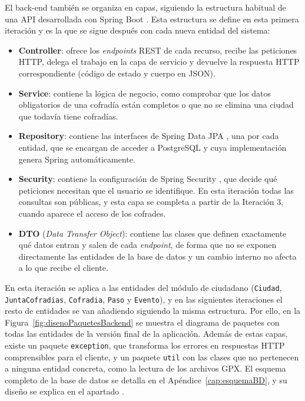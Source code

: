 El back-end también se organiza en capas, siguiendo la estructura habitual de una API desarrollada con Spring Boot \cite{sommerville2015}. Esta estructura se define en esta primera iteración y es la que se sigue después con cada nueva entidad del sistema:

\begin{itemize}
    \item \textbf{Controller}: ofrece los \emph{endpoints} REST de cada recurso, recibe las peticiones HTTP, delega el trabajo en la capa de servicio y devuelve la respuesta HTTP correspondiente (código de estado y cuerpo en JSON).
    \item \textbf{Service}: contiene la lógica de negocio, como comprobar que los datos obligatorios de una cofradía están completos o que no se elimina una ciudad que todavía tiene cofradías.
    \item \textbf{Repository}: contiene las interfaces de Spring Data JPA \cite{springdatajpa}, una por cada entidad, que se encargan de acceder a PostgreSQL y cuya implementación genera Spring automáticamente.
    \item \textbf{Security}: contiene la configuración de Spring Security \cite{springsecurity}, que decide qué peticiones necesitan que el usuario se identifique. En esta iteración todas las consultas son públicas, y esta capa se completa a partir de la Iteración 3, cuando aparece el acceso de los cofrades.
    \item \textbf{DTO} (\emph{Data Transfer Object}): contiene las clases que definen exactamente qué datos entran y salen de cada \emph{endpoint}, de forma que no se exponen directamente las entidades de la base de datos y un cambio interno no afecta a lo que recibe el cliente.
\end{itemize}

En esta iteración se aplica a las entidades del módulo de ciudadano (\texttt{Ciudad}, \texttt{JuntaCofradias}, \texttt{Cofradia}, \texttt{Paso} y \texttt{Evento}), y en las siguientes iteraciones el resto de entidades se van añadiendo siguiendo la misma estructura. Por ello, en la Figura~\ref{fig:disenoPaquetesBackend} se muestra el diagrama de paquetes con todas las entidades de la versión final de la aplicación. Además de estas capas, existe un paquete \texttt{exception}, que transforma los errores en respuestas HTTP comprensibles para el cliente, y un paquete \texttt{util} con las clases que no pertenecen a ninguna entidad concreta, como la lectura de los archivos GPX. El esquema completo de la base de datos se detalla en el Apéndice~\ref{cap:esquemaBD}, y su diseño se explica en el apartado .

